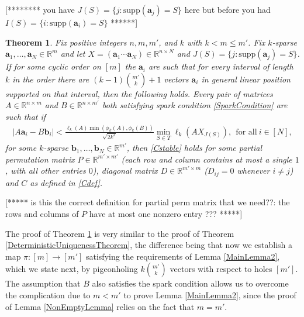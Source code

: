 \documentclass[journal, onecolumn]{IEEEtran}
\newtheorem{theorem}{Theorem}
\begin{document}
[******** you have $J(S) = \{j : \text{supp}(\mathbf{a}_j) = S\}$ here but before you had $I(S) = \{i : \text{supp}(\mathbf{a}_i) = S\}$ ******]
\begin{theorem}\label{DeterministicUniquenessTheorem2}
Fix positive integers $n, m, m'$, and $k$ with $k < m \leq m'$. Fix $k$-sparse $\mathbf{a}_1, \ldots, \mathbf{a}_N \in \mathbb{R}^m$ and let $X  = (\mathbf{a}_1 \cdots \mathbf{a}_N) \in \mathbb{R}^{n \times N}$ and $J(S) = \{j : \text{supp}(\mathbf{a}_j) = S\}$. If for some cyclic order on $[m]$ the $\mathbf{a}_i$ are such that for every interval of length $k$ in the order there are $(k-1){m' \choose k}+1$ vectors $\mathbf{a}_i$ in general linear position supported on that interval, then the following holds. Every pair of matrices $A \in \mathbb{R}^{n \times m}$ and $B \in \mathbb{R}^{n \times m'}$ both satisfying spark condition \eqref{SparkCondition} are such that if 
\begin{align}
|A\mathbf{a}_i - B\mathbf{b}_i| < \frac{ \ell_{k}(A) \min(\phi_k(A), \phi_k(B))}{\sqrt{2k^3} } \min_{S \in T} \ell_k(AX_{J(S)}), \ \  \text{for all} \  i \in [N],
\end{align}
%
for some $k$-sparse $\mathbf{b}_1, \ldots, \mathbf{b}_N \in \mathbb{R}^{m'}$, then \eqref{Cstable} holds for some partial permutation matrix $P \in \mathbb{R}^{m' \times m'}$ (each row and column contains at most a single $1$, with all other entries $0$), diagonal matrix $D \in \mathbb{R}^{m' \times m}$ ($D_{ij} = 0$ whenever $i \neq j$) and $C$ as defined in \eqref{Cdef}. 
\end{theorem}
[***** is this the correct definition for partial perm matrix that we need??:  the rows and columns of $P$ have at most one nonzero entry ??? *****]

The proof of Theorem \ref{DeterministicUniquenessTheorem2} is very similar to the proof of Theorem \ref{DeterministicUniquenessTheorem}, the difference being that now we establish a map $\pi: [m] \to [m']$ satisfying the requirements of Lemma \ref{MainLemma2}, which we state next, by pigeonholing $k{m' \choose k}$ vectors with respect to holes $[m']$. The assumption that $B$ also satisfies the spark condition allows us to overcome the complication due to $m < m'$ to prove Lemma \ref{MainLemma2}, since the proof of Lemma \ref{NonEmptyLemma} relies on the fact that $m = m'$. 
\end{document}
